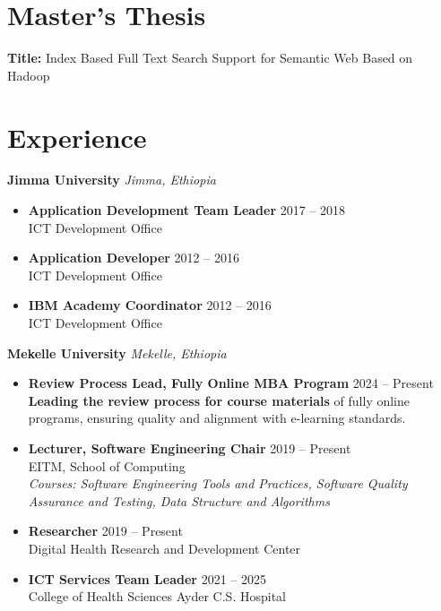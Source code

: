 \documentclass[11pt,a4paper]{article}
\begin{document}
\section*{ Master's Thesis}
\textbf{Title:} Index Based Full Text Search Support for Semantic Web Based on Hadoop

\section*{ Experience}

\noindent \textbf{\Large Jimma University} \hfill \textit{Jimma, Ethiopia}
\vspace{0.3em}

\begin{itemize}[leftmargin=*,noitemsep,topsep=0pt]
    \item \textbf{Application Development Team Leader} \hfill 2017 -- 2018 \\
    ICT Development Office
    \item \textbf{Application Developer} \hfill 2012 -- 2016 \\
    ICT Development Office
    \item \textbf{IBM Academy Coordinator} \hfill 2012 -- 2016 \\
    ICT Development Office
\end{itemize}

\vspace{0.8em}

\noindent \textbf{\Large Mekelle University} \hfill \textit{Mekelle, Ethiopia}
\vspace{0.3em}

\begin{itemize}[leftmargin=*,noitemsep,topsep=0pt]
    \item \textbf{Review Process Lead, Fully Online MBA Program} \hfill 2024 -- Present \\
    \textbf{Leading the review process for course materials} of fully online programs, ensuring quality and alignment with e-learning standards.
    \item \textbf{Lecturer, Software Engineering Chair} \hfill 2019 -- Present \\
    EITM, School of Computing \\
    \textit{Courses: Software Engineering Tools and Practices, Software Quality Assurance and Testing, Data Structure and Algorithms}
    \item \textbf{Researcher} \hfill 2019 -- Present \\
    Digital Health Research and Development Center
    \item \textbf{ICT Services Team Leader} \hfill 2021 -- 2025 \\
    College of Health Sciences Ayder C.S. Hospital
\end{itemize}
\end{document}
